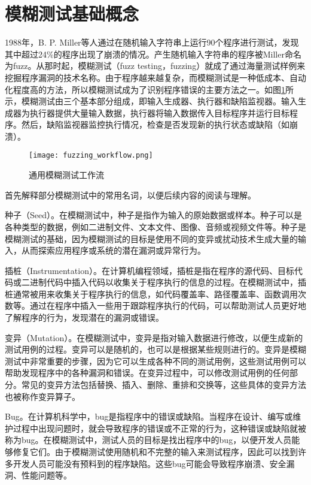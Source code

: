 \documentclass[master]{thesis-uestc}
\begin{document}
\section{模糊测试基础概念}
1988年，B. P. Miller等人通过在随机输入字符串上运行90个程序进行测试，发现其中超过24\%的程序出现了崩溃的情况。产生随机输入字符串的程序被Miller命名为fuzz。从那时起，模糊测试（fuzz testing，fuzzing）就成了通过海量测试样例来挖掘程序漏洞的技术名称。由于程序越来越复杂，而模糊测试是一种低成本、自动化程度高的方法，所以模糊测试成为了识别程序错误的主要方法之一。如图\ref{fuzzing_workflow}所示，模糊测试由三个基本部分组成，即输入生成器、执行器和缺陷监视器。输入生成器为执行器提供大量输入数据，执行器将输入数据传入目标程序并运行目标程序。然后，缺陷监视器监控执行情况，检查是否发现新的执行状态或缺陷（如崩溃）。

\begin{figure}[!htbp]
    \vspace{6pt}
    \centering
    \texttt{[image: fuzzing\_workflow.png]}
    \caption{通用模糊测试工作流}
    \label{fuzzing_workflow}
\end{figure}

首先解释部分模糊测试中的常用名词，以便后续内容的阅读与理解。

种子（Seed）。在模糊测试中，种子是指作为输入的原始数据或样本。种子可以是各种类型的数据，例如二进制文件、文本文件、图像、音频或视频文件等。种子是模糊测试的基础，因为模糊测试的目标是使用不同的变异或扰动技术生成大量的输入，从而探索应用程序或系统的潜在漏洞或异常行为。

插桩（Instrumentation）。在计算机编程领域，插桩是指在程序的源代码、目标代码或二进制代码中插入代码以收集关于程序执行的信息的过程。在模糊测试中，插桩通常被用来收集关于程序执行的信息，如代码覆盖率、路径覆盖率、函数调用次数等。通过在程序中插入一些用于跟踪程序执行的代码，可以帮助测试人员更好地了解程序的行为，发现潜在的漏洞或错误。

变异（Mutation）。在模糊测试中，变异是指对输入数据进行修改，以便生成新的测试用例的过程。变异可以是随机的，也可以是根据某些规则进行的。变异是模糊测试中非常重要的步骤，因为它可以生成各种不同的测试用例，这些测试用例可以帮助发现程序中的各种漏洞和错误。在变异过程中，可以修改测试用例的任何部分。常见的变异方法包括替换、插入、删除、重排和交换等，这些具体的变异方法也被称作变异算子。

Bug。在计算机科学中，bug是指程序中的错误或缺陷。当程序在设计、编写或维护过程中出现问题时，就会导致程序的错误或不正常的行为，这种错误或缺陷就被称为bug。在模糊测试中，测试人员的目标是找出程序中的bug，以便开发人员能够修复它们。由于模糊测试使用随机和不完整的输入来测试程序，因此可以找到许多开发人员可能没有预料到的程序缺陷。这些bug可能会导致程序崩溃、安全漏洞、性能问题等。
\end{document}
